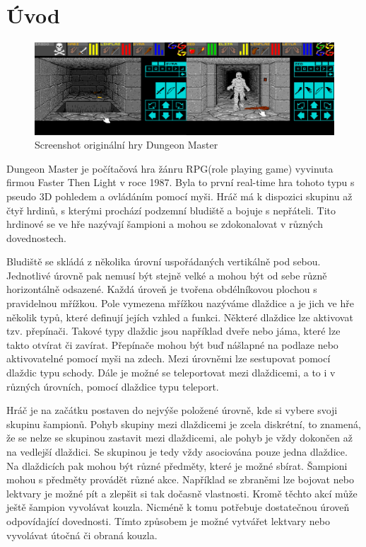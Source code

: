 ﻿\chapter{Úvod}
\begin{figure}[ht]\centering
\includegraphics[width=\textwidth]{./img/DM-original-screen.png}
\caption{Screenshot originální hry Dungeon Master}
\label{obr0:uvod}
\end{figure}

Dungeon Master je počítačová hra žánru RPG(role playing game) vyvinuta firmou Faster Then Light v roce 1987.
Byla to první real-time hra tohoto typu s pseudo 3D pohledem a ovládáním pomocí myši. Hráč má k dispozici skupinu až čtyř hrdinů,
s kterými prochází podzemní bludiště a bojuje s nepřáteli. Tito hrdinové se ve hře nazývají šampioni a mohou se 
zdokonalovat v různých dovednostech. 

Bludiště se skládá z několika úrovní uspořádaných vertikálně pod sebou. 
Jednotlivé úrovně pak nemusí být stejně velké a mohou být od sebe různě horizontálně odsazené.
Každá úroveň je tvořena obdélníkovou plochou s pravidelnou mřížkou. Pole vymezena mřížkou nazýváme dlaždice a je jich 
ve hře několik typů, které definují jejích vzhled a funkci. Některé dlaždice lze aktivovat tzv. přepínači. Takové typy dlaždic
jsou například dveře nebo jáma, které lze takto otvírat či zavírat. Přepínače mohou být buď nášlapné na podlaze nebo aktivovatelné
pomocí myši na zdech. Mezi úrovněmi lze sestupovat pomocí dlaždic typu schody.  Dále je možné se teleportovat mezi dlaždicemi, a to i v různých úrovních, pomocí dlaždice
typu teleport.  

Hráč je na začátku postaven do nejvýše položené úrovně, kde si vybere svoji skupinu šampionů. 
Pohyb skupiny mezi dlaždicemi je zcela diskrétní, to znamená, že se nelze se skupinou zastavit mezi dlaždicemi, ale pohyb je vždy dokončen
až na vedlejší dlaždici. Se skupinou je tedy vždy asociována pouze jedna dlaždice. Na dlaždicích pak mohou
být různé předměty, které je možné sbírat. Šampioni mohou s předměty provádět různé akce.
Například se zbraněmi lze bojovat nebo lektvary je možné pít a zlepšit si tak dočasně vlastnosti. Kromě těchto 
akcí může ještě šampion vyvolávat kouzla. Nicméně k tomu potřebuje dostatečnou úroveň odpovídající dovednosti.
Tímto způsobem je možné vytvářet lektvary nebo vyvolávat útočná či obraná kouzla.

